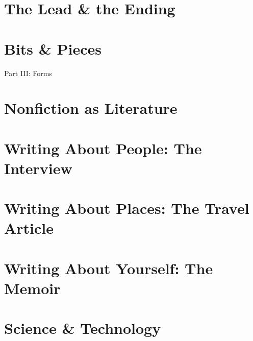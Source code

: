 \documentclass{article}
\begin{document}
\section{The Lead \& the Ending}


\section{Bits \& Pieces}


\begin{center}\huge
	Part III: Forms
\end{center}


\section{Nonfiction as Literature}


\section{Writing About People: The Interview}


\section{Writing About Places: The Travel Article}


\section{Writing About Yourself: The Memoir}


\section{Science \& Technology}
\end{document}
